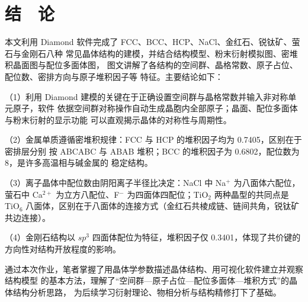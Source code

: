 \setcounter{section}{6}
\section{结　论}

本文利用 Diamond 软件完成了 FCC、BCC、HCP、NaCl、金红石、锐钛矿、萤石与金刚石八种
常见晶体结构的建模，并结合结构模型、粉末衍射模拟图、密堆积晶面图与配位多面体图，
图文讲解了各结构的空间群、晶格常数、原子占位、配位数、密排方向与原子堆积因子等
特征。主要结论如下：

（1）利用 Diamond 建模的关键在于正确设置空间群与晶格常数并输入非对称单元原子，软件
依据空间群对称操作自动生成晶胞内全部原子；晶面、配位多面体与粉末衍射的显示功能
可以直观揭示晶体的对称性与周期性。

（2）金属单质遵循密堆积规律：FCC 与 HCP 的堆积因子均为 0.7405，区别在于密排层分别
按 ABCABC 与 ABAB 堆积；BCC 的堆积因子为 0.6802，配位数为 8，是许多高温相与碱金属的
稳定结构。

（3）离子晶体中配位数由阴阳离子半径比决定：NaCl 中 Na$^+$ 为八面体六配位，萤石中
Ca$^{2+}$ 为立方八配位、F$^-$ 为四面体四配位；TiO$_2$ 两种晶型的共同点是 TiO$_6$
八面体，区别在于八面体的连接方式（金红石共棱成链、链间共角，锐钛矿共边连接）。

（4）金刚石结构以 $sp^3$ 四面体配位为特征，堆积因子仅 0.3401，体现了共价键的
方向性对结构开放程度的影响。

通过本次作业，笔者掌握了用晶体学参数描述晶体结构、用可视化软件建立并观察结构模型
的基本方法，理解了``空间群—原子占位—配位多面体—堆积方式''的晶体结构分析思路，
为后续学习衍射理论、物相分析与结构精修打下了基础。
